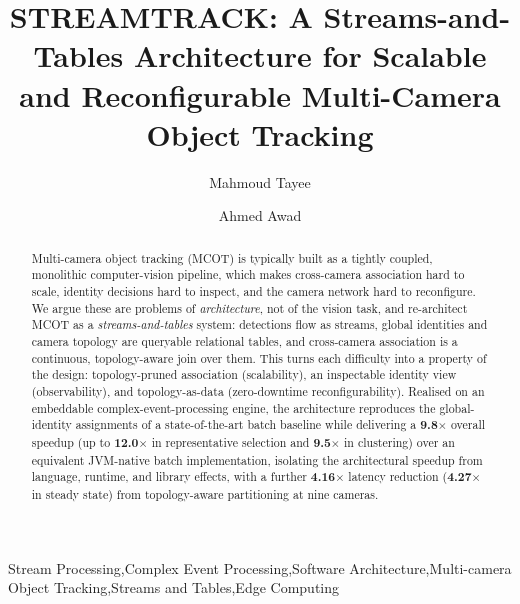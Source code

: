 \documentclass[review]{elsarticle}
\begin{document}
\begin{frontmatter}
    \title{STREAMTRACK: A Streams-and-Tables Architecture for Scalable and Reconfigurable Multi-Camera Object Tracking}
    \author[add1]{Mahmoud Tayee}%
    \author[add2,add3]{Ahmed Awad}

\address[add1]{Nile University, Giza, Egypt}
\address[add2]{Faculty of Computers and Artificial Intelligence, Cairo University, Egypt}
\address[add3]{The British University in Dubai, Dubai, The UAE}

\begin{abstract}
Multi-camera object tracking (MCOT) is typically built as a tightly coupled, monolithic computer-vision pipeline, which makes cross-camera association hard to scale, identity decisions hard to inspect, and the camera network hard to reconfigure. We argue these are problems of \emph{architecture}, not of the vision task, and re-architect MCOT as a \emph{streams-and-tables} system: detections flow as streams, global identities and camera topology are queryable relational tables, and cross-camera association is a continuous, topology-aware join over them. 
This turns each difficulty into a property of the design: topology-pruned association (scalability), an inspectable identity view (observability), and topology-as-data (zero-downtime reconfigurability). Realised on an embeddable complex-event-processing engine, the architecture reproduces the
global-identity assignments of a state-of-the-art batch baseline while delivering a \textbf{9.8$\times$} overall speedup (up to \textbf{12.0$\times$} in representative selection and \textbf{9.5$\times$} in clustering) over an equivalent JVM-native batch implementation, isolating the architectural speedup from language, runtime, and library effects, with a further \textbf{4.16$\times$} latency reduction (\textbf{4.27$\times$} in
 steady state) from topology-aware partitioning at nine cameras. 
 

\end{abstract}


\begin{keyword}
Stream Processing\sep Complex Event Processing\sep Software Architecture\sep Multi-camera Object Tracking\sep Streams and Tables\sep Edge Computing
\end{keyword}

\end{frontmatter}
\end{document}

